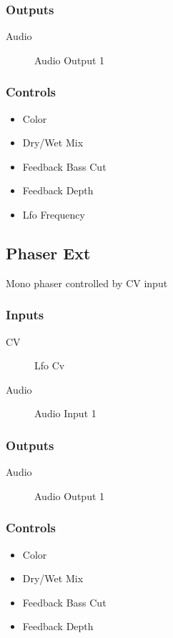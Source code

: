 \subsubsection{Outputs}
\begin{description}
\item [Audio] Audio Output 1
\end{description}

\subsubsection{Controls}
\begin{itemize}
\item Color
\item Dry/Wet Mix
\item Feedback Bass Cut
\item Feedback Depth
\item Lfo Frequency
\end{itemize}

\subsection{Phaser Ext}

Mono phaser controlled by CV input



\subsubsection{Inputs}
\begin{description}
\item [CV] Lfo Cv
\item [Audio] Audio Input 1
\end{description}

\subsubsection{Outputs}
\begin{description}
\item [Audio] Audio Output 1
\end{description}

\subsubsection{Controls}
\begin{itemize}
\item Color
\item Dry/Wet Mix
\item Feedback Bass Cut
\item Feedback Depth
\end{itemize}

